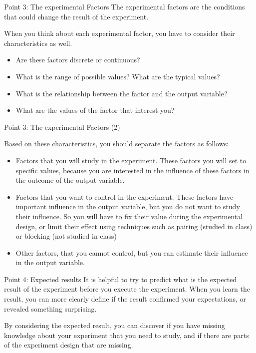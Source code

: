 \begin{frame}{Point 3: The experimental Factors}
  The experimental factors are the conditions that could change the result of the experiment. \bigskip

  When you think about each experimental factor, you have to consider their characteristics as well.\bigskip

  \begin{itemize}
    \item Are these factors discrete or continuous?
    \item What is the range of possible values? What are the typical values?
    \item What is the relationship between the factor and the output variable?
    \item What are the values of the factor that interest you?
  \end{itemize}\bigskip
\end{frame}

\begin{frame}{Point 3: The experimental Factors (2)}

  Based on these characteristics, you should separate the factors as follows:\bigskip

  \begin{itemize}
    \item Factors that you will study in the experiment. These factors you will set to specific values, because you are interested in the influence of these factors in the outcome of the output variable.
    \item Factors that you want to control in the experiment. These factors have important influence in the output variable, but you do not want to study their influence. So you will have to fix their value during the experimental design, or limit their effect using techniques such as pairing (studied in class) or blocking (not studied in class)
    \item Other factors, that you cannot control, but you can estimate their influence in the output variable.
  \end{itemize}

\end{frame}

\begin{frame}{Point 4: Expected results}
  It is helpful to try to predict what is the expected result of the experiment before you execute the experiment. When you learn the result, you can more clearly define if the result confirmed your expectations, or revealed something surprising.\bigskip

  By considering the expected result, you can discover if you have missing knowledge about your experiment that you need to study, and if there are parts of the experiment design that are missing.
\end{frame}

